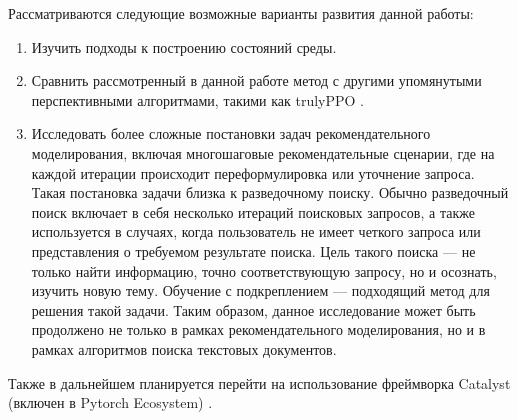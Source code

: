 \documentclass[14pt]{extarticle}
\begin{document}
Рассматриваются следующие возможные варианты развития данной работы:

\begin{enumerate}
\item Изучить подходы к построению состояний среды.

\item Сравнить рассмотренный в данной работе метод с другими упомянутыми перспективными алгоритмами, такими как trulyPPO \cite{trulyPPO}.
\item Исследовать более сложные постановки задач рекомендательного моделирования, включая многошаговые рекомендательные сценарии, где на каждой итерации происходит переформулировка или уточнение запроса. Такая постановка задачи близка к разведочному поиску. Обычно разведочный поиск включает в себя несколько итераций поисковых запросов, а также используется в случаях, когда пользователь не имеет четкого запроса или представления о требуемом результате поиска. Цель такого поиска — не только найти информацию, точно соответствующую запросу, но и осознать, изучить новую тему. Обучение с подкреплением --- подходящий метод для решения такой задачи. Таким образом, данное исследование может быть продолжено не только в рамках рекомендательного моделирования, но и в рамках алгоритмов поиска текстовых документов.

\end{enumerate}

Также в дальнейшем планируется перейти на использование фреймворка Catalyst (включен в Pytorch Ecosystem) \cite{catalyst}.

\newpage


\newpage
{}


\nocite{*}
\end{document}
